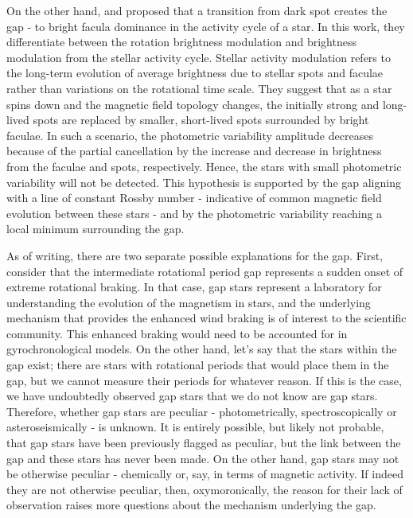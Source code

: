 On the other hand, \citet{reinhold_transition_2019} and \citet{reinhold_stellar_2020} proposed that a transition from dark spot creates the gap - to bright facula dominance in the activity cycle of a star.
In this work, they differentiate between the rotation brightness modulation and brightness modulation from the stellar activity cycle.
Stellar activity modulation refers to the long-term evolution of average brightness due to stellar spots and faculae rather than variations on the rotational time scale.
They suggest that as a star spins down and the magnetic field topology changes, the initially strong and long-lived spots are replaced by smaller, short-lived spots surrounded by bright faculae.
In such a scenario, the photometric variability amplitude decreases because of the partial cancellation by the increase and decrease in brightness from the faculae and spots, respectively.
Hence, the stars with small photometric variability will not be detected.
This hypothesis is supported by the gap aligning with a line of constant Rossby number - indicative of common magnetic field evolution between these stars - and by the photometric variability reaching a local minimum surrounding the gap.

As of writing, there are two separate possible explanations for the gap.
First, consider that the intermediate rotational period gap represents a sudden onset of extreme rotational braking.
In that case, gap stars represent a laboratory for understanding the evolution of the magnetism in stars, and the underlying mechanism that provides the enhanced wind braking is of interest to the scientific community. 
This enhanced braking would need to be accounted for in gyrochronological models.
On the other hand, let's say that the stars within the gap exist; there are stars with rotational periods that would place them in the gap, but we cannot measure their periods for whatever reason.
If this is the case, we have undoubtedly observed gap stars that we do not know are gap stars.
Therefore, whether gap stars are peculiar - photometrically, spectroscopically or asteroseismically - is unknown.
It is entirely possible, but likely not probable, that gap stars have been previously flagged as peculiar, but the link between the gap and these stars has never been made.
On the other hand, gap stars may not be otherwise peculiar - chemically or, say, in terms of magnetic activity.
If indeed they are not otherwise peculiar, then, oxymoronically, the reason for their lack of observation raises more questions about the mechanism underlying the gap.

